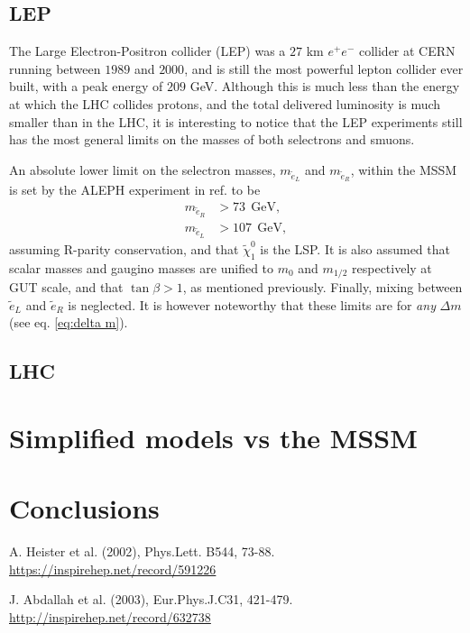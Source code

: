 \documentclass[twocolumn,a4paper,10pt]{article}
\begin{document}
\subsection{LEP}

The Large Electron-Positron collider (LEP) was a $27$ km $e^+e^-$ collider at CERN running between 
$1989$ and $2000$, and is still the most powerful lepton collider ever built, with a peak energy of 
$209$ GeV. Although this is much less than the energy at which the LHC collides protons, and the 
total delivered luminosity is much smaller than in the LHC, it is interesting to notice that the 
LEP experiments still has the most general limits on the masses of both selectrons and smuons.  

An absolute lower limit on the selectron masses, $m_{\tilde{e}_L}$ and $m_{\tilde{e}_R}$,  within the 
MSSM is set by the ALEPH experiment in ref. \cite{ALEPH:2002} to be  
\begin{align*}
m_{\tilde{e}_R} & > 73 \:\: \text{GeV}, \\
m_{\tilde{e}_L} & > 107 \:\: \text{GeV},   
\end{align*}       
assuming R-parity conservation, and that $\tilde{\chi}_1^0$ is the LSP. It is also assumed that 
scalar masses and gaugino masses are unified to $m_0$ and $m_{1/2}$ respectively at GUT scale, and 
that $\tan\beta > 1$, as mentioned previously. Finally, mixing between $\tilde{e}_L$ and $\tilde{e}_R$ 
is neglected. It is however noteworthy that these limits are for \textit{any} $\Delta m$ (see eq. 
\ref{eq:delta m}). 



\subsection{LHC}

\section{Simplified models vs the MSSM}

\section{Conclusions}

\begin{thebibliography}{9}


  A. Heister et al. (2002), Phys.Lett. B544, 73-88. 
  \href{https://inspirehep.net/record/591226}{https://inspirehep.net/record/591226}
 
  J. Abdallah et al. (2003), Eur.Phys.J.C31, 421-479. 
  \href{http://inspirehep.net/record/632738}{http://inspirehep.net/record/632738}	

  
\end{thebibliography}
\end{document}

